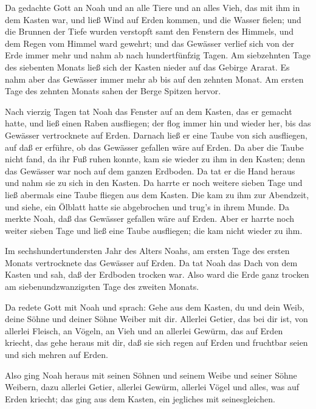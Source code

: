  Da gedachte Gott an Noah und an alle Tiere und an alles
Vieh, das mit ihm in dem Kasten war, und ließ Wind auf Erden kommen, und
die Wasser fielen;  und die Brunnen der Tiefe wurden
verstopft samt den Fenstern des Himmels, und dem Regen vom Himmel ward
gewehrt;  und das Gewässer verlief sich von der Erde immer
mehr und nahm ab nach hundertfünfzig Tagen.  Am siebzehnten
Tage des siebenten Monats ließ sich der Kasten nieder auf das Gebirge
Ararat.  Es nahm aber das Gewässer immer mehr ab bis auf den
zehnten Monat. Am ersten Tage des zehnten Monats sahen der Berge Spitzen
hervor.

 Nach vierzig Tagen tat Noah das Fenster auf an dem Kasten,
das er gemacht hatte,  und ließ einen Raben ausfliegen; der
flog immer hin und wieder her, bis das Gewässer vertrocknete auf Erden.
 Darnach ließ er eine Taube von sich ausfliegen, auf daß er
erführe, ob das Gewässer gefallen wäre auf Erden.  Da aber
die Taube nicht fand, da ihr Fuß ruhen konnte, kam sie wieder zu ihm in
den Kasten; denn das Gewässer war noch auf dem ganzen Erdboden. Da tat
er die Hand heraus und nahm sie zu sich in den Kasten.  Da
harrte er noch weitere sieben Tage und ließ abermals eine Taube fliegen
aus dem Kasten.  Die kam zu ihm zur Abendzeit, und siehe,
ein Ölblatt hatte sie abgebrochen und trug's in ihrem Munde. Da merkte
Noah, daß das Gewässer gefallen wäre auf Erden.  Aber er
harrte noch weiter sieben Tage und ließ eine Taube ausfliegen; die kam
nicht wieder zu ihm.

 Im sechshundertundersten Jahr des Alters Noahs, am ersten
Tage des ersten Monats vertrocknete das Gewässer auf Erden. Da tat Noah
das Dach von dem Kasten und sah, daß der Erdboden trocken war.
 Also ward die Erde ganz trocken am siebenundzwanzigsten
Tage des zweiten Monats.

 Da redete Gott mit Noah und sprach:  Gehe aus
dem Kasten, du und dein Weib, deine Söhne und deiner Söhne Weiber mit
dir.  Allerlei Getier, das bei dir ist, von allerlei
Fleisch, an Vögeln, an Vieh und an allerlei Gewürm, das auf Erden
kriecht, das gehe heraus mit dir, daß sie sich regen auf Erden und
fruchtbar seien und sich mehren auf Erden.

 Also ging Noah heraus mit seinen Söhnen und seinem Weibe
und seiner Söhne Weibern,  dazu allerlei Getier, allerlei
Gewürm, allerlei Vögel und alles, was auf Erden kriecht; das ging aus
dem Kasten, ein jegliches mit seinesgleichen.

